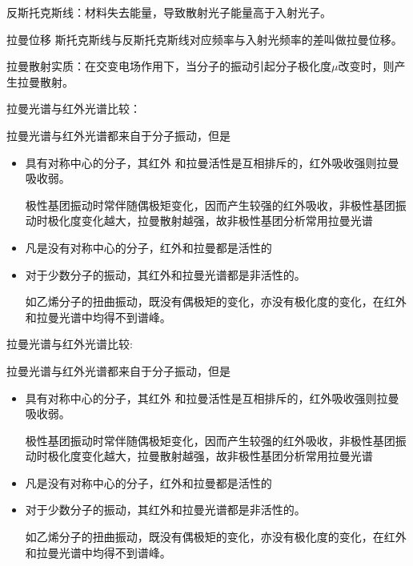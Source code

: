 反斯托克斯线：材料失去能量，导致散射光子能量高于入射光子。
\begin{definition*}{拉曼位移}
	斯托克斯线与反斯托克斯线对应频率与入射光频率的差叫做拉曼位移。
\end{definition*}

拉曼散射实质：在交变电场作用下，当分子的振动引起分子极化度$\mu$改变时，则产生拉曼散射。

\begin{note}

    拉曼光谱与红外光谱比较：

    拉曼光谱与红外光谱都来自于分子振动，但是
    \begin{itemize}
        \item 具有对称中心的分子，其红外	和拉曼活性是互相排斥的，红外吸收强则拉曼吸收弱。
        
        \begin{example}
            极性基团振动时常伴随偶极矩变化，因而产生较强的红外吸收，非极性基团振动时极化度变化越大，拉曼散射越强，故非极性基团分析常用拉曼光谱
        \end{example}
        \item 凡是没有对称中心的分子，红外和拉曼都是活性的
        \item 对于少数分子的振动，其红外和拉曼光谱都是非活性的。
        \begin{example}
            如乙烯分子的扭曲振动，既没有偶极矩的变化，亦没有极化度的变化，在红外和拉曼光谱中均得不到谱峰。
        \end{example}
    \end{itemize}
	拉曼光谱与红外光谱比较:
	
	拉曼光谱与红外光谱都来自于分子振动，但是
	\begin{itemize}
		\item 具有对称中心的分子，其红外	和拉曼活性是互相排斥的，红外吸收强则拉曼吸收弱。         \begin{example}
			极性基团振动时常伴随偶极矩变化，因而产生较强的红外吸收，非极性基团振动时极化度变化越大，拉曼散射越强，故非极性基团分析常用拉曼光谱
		\end{example}
		\item 凡是没有对称中心的分子，红外和拉曼都是活性的
		\item 对于少数分子的振动，其红外和拉曼光谱都是非活性的。
		\begin{example}
			如乙烯分子的扭曲振动，既没有偶极矩的变化，亦没有极化度的变化，在红外和拉曼光谱中均得不到谱峰。
		\end{example}
	\end{itemize}
\end{note}

